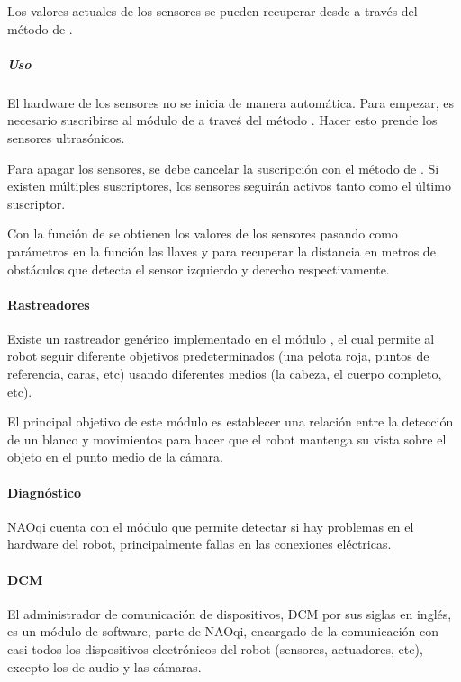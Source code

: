 Los valores actuales de los sensores se pueden recuperar desde  a través
del método  de .


\subparagraph{Uso}
\label{\detokenize{chapter_one/naoqi:id3}}
El hardware de los sensores no se inicia de manera automática. Para empezar,
es necesario suscribirse al módulo de  a traveś del método .
Hacer esto prende los sensores ultrasónicos.

Para apagar los sensores, se debe cancelar la suscripción con el método
 de . Si existen múltiples suscriptores,
los sensores seguirán activos tanto como el último suscriptor.

Con la función  de  se obtienen los valores de los sensores
pasando como parámetros en la función las llaves
 y
 para recuperar la distancia
en metros de obstáculos que detecta el sensor izquierdo y derecho
respectivamente.


\paragraph{Rastreadores}
\label{\detokenize{chapter_one/naoqi:rastreadores}}
Existe un rastreador genérico implementado en el módulo , el cual
permite al robot seguir diferente objetivos predeterminados (una pelota roja,
puntos de referencia, caras, etc) usando diferentes medios (la cabeza, el
cuerpo completo, etc).

El principal objetivo de este módulo es establecer una relación entre la
detección de un blanco y movimientos para hacer que el robot mantenga
su vista sobre el objeto en el punto medio de la cámara.


\paragraph{Diagnóstico}
\label{\detokenize{chapter_one/naoqi:diagnostico}}
NAOqi cuenta con el módulo   que permite detectar si hay
problemas en el hardware del robot, principalmente fallas en las conexiones eléctricas.


\paragraph{DCM}
\label{\detokenize{chapter_one/naoqi:dcm}}
El administrador de comunicación de dispositivos, DCM por sus siglas en inglés,
es un módulo de software, parte de NAOqi, encargado de la comunicación con
casi todos los dispositivos electrónicos del robot (sensores, actuadores, etc),
excepto los de audio y las cámaras.


